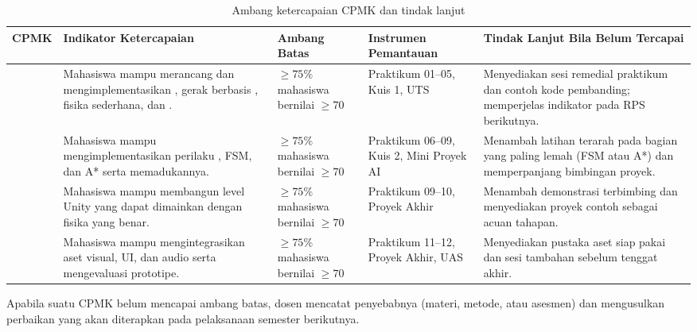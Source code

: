 \begin{table}[htbp]
\centering
\caption{Ambang ketercapaian CPMK dan tindak lanjut}
\label{tab:ambang}
\begin{tabularx}{\textwidth}{@{}C{1.8cm} L{3.2cm} C{2.2cm} L{3.2cm} Y@{}}
\toprule
\headrow \textbf{CPMK} & \textbf{Indikator Ketercapaian} & \textbf{Ambang Batas} & \textbf{Instrumen Pemantauan} & \textbf{Tindak Lanjut Bila Belum Tercapai} \\
\midrule
{} &
Mahasiswa mampu merancang dan mengimplementasikan , gerak berbasis , fisika sederhana, dan . &
$\geq 75\%$ mahasiswa bernilai $\geq 70$ &
Praktikum 01--05, Kuis 1, UTS &
Menyediakan sesi remedial praktikum dan contoh kode pembanding; memperjelas indikator pada RPS berikutnya. \\
\addlinespace
{} &
Mahasiswa mampu mengimplementasikan perilaku , FSM, dan A* serta memadukannya. &
$\geq 75\%$ mahasiswa bernilai $\geq 70$ &
Praktikum 06--09, Kuis 2, Mini Proyek AI &
Menambah latihan terarah pada bagian yang paling lemah (FSM atau A*) dan memperpanjang bimbingan proyek. \\
\addlinespace
{} &
Mahasiswa mampu membangun level Unity yang dapat dimainkan dengan fisika yang benar. &
$\geq 75\%$ mahasiswa bernilai $\geq 70$ &
Praktikum 09--10, Proyek Akhir &
Menambah demonstrasi terbimbing dan menyediakan proyek contoh sebagai acuan tahapan. \\
\addlinespace
{} &
Mahasiswa mampu mengintegrasikan aset visual, UI, dan audio serta mengevaluasi prototipe. &
$\geq 75\%$ mahasiswa bernilai $\geq 70$ &
Praktikum 11--12, Proyek Akhir, UAS &
Menyediakan pustaka aset siap pakai dan sesi  tambahan sebelum tenggat akhir. \\
\bottomrule
\end{tabularx}
\end{table}

Apabila suatu CPMK belum mencapai ambang batas, dosen mencatat penyebabnya
(materi, metode, atau asesmen) dan mengusulkan perbaikan yang akan diterapkan
pada pelaksanaan semester berikutnya.
